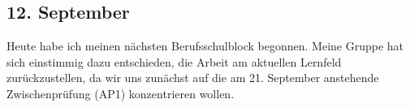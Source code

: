 \subsection{12. September}
Heute habe ich meinen nächsten Berufsschulblock begonnen. Meine Gruppe hat sich einstimmig dazu entschieden, die Arbeit am aktuellen Lernfeld zurückzustellen, da wir uns zunächst auf die am 21. September anstehende Zwischenprüfung (AP1) konzentrieren wollen.